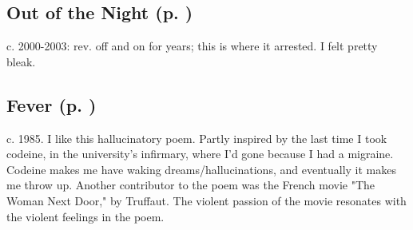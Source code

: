 \subsection*{Out of the Night (p. \pageref{ch:out_of_the_night})}
c. 2000-2003: rev. off and on for years; this is where it
arrested. I felt pretty bleak.

\subsection*{Fever (p. \pageref{ch:fever})}
c. 1985. I like this hallucinatory poem. Partly inspired
by the last time I took codeine, in the university's infirmary, where
I'd gone because I had a migraine. Codeine makes me have waking
dreams/hallucinations, and eventually it makes me throw up. Another
contributor to the poem was the French movie "The Woman Next Door," by
Truffaut. The violent passion of the movie resonates with the violent
feelings in the poem.
